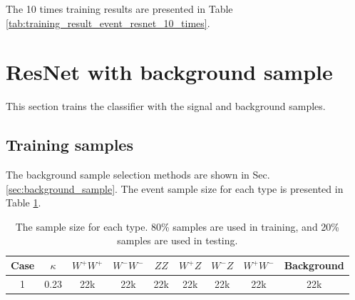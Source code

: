 \documentclass[12pt]{article}
\begin{document}
		The 10 times training results are presented in Table \ref{tab:training_result_event_resnet_10_times}.
		\begin{table}[htpb]
			\centering
			\caption{The training results of the full event. The average and standard deviation of 10 training are presented.}
			\label{tab:training_result_event_resnet_10_times}
		\end{table}

\section{ResNet with background sample}%
\label{sec:resnet_with_background_sample}
	This section trains the classifier with the signal and background samples.
	\subsection{Training samples}%
	\label{sub:training_samples}
		The background sample selection methods are shown in Sec. \ref{sec:background_sample}. The event sample size for each type is presented in Table \ref{tab:full_event_sample_size_with_bkg}.
		\begin{table}[htpb]
			\centering
			\caption{The sample size for each type. 80\% samples are used in training, and 20\% samples are used in testing.}
			\label{tab:full_event_sample_size_with_bkg}
			\begin{tabular}{c|c|c|c|c|c|c|c|c}
			Case &$\kappa$& $W^+W^+$ & $W^-W^-$ & $ZZ$ & $W^+Z$ & $W^-Z$ & $W^+W^-$ & Background \\ \hline
			1    & 0.23   & 22k      & 22k      & 22k  & 22k    & 22k    & 22k      & 22k   
			\end{tabular}
		\end{table}
\end{document}
